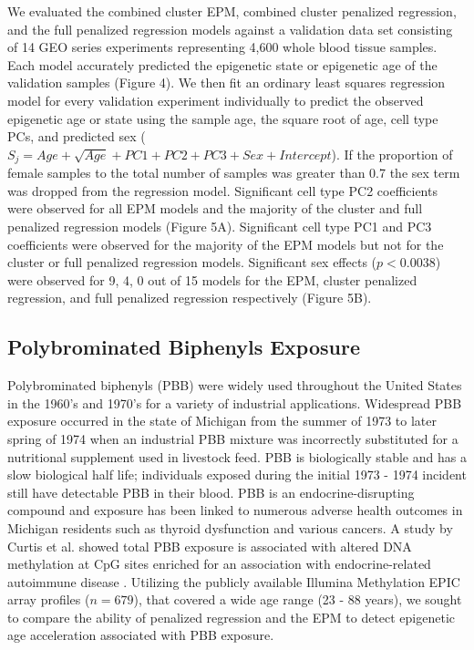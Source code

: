 \documentclass{article}
\begin{document}
{{\begin{linenumbers}
We evaluated the combined cluster EPM, combined cluster penalized regression, and the full penalized regression models 
against a validation data set consisting of 14 GEO series experiments representing 4,600 whole blood tissue samples. 
Each model accurately predicted the epigenetic state or epigenetic age of the validation samples (Figure 4). We then 
fit an ordinary least squares regression model for every validation experiment individually to predict the observed 
epigenetic age or state using the sample age, the square root of age, cell type PCs, and predicted sex 
($S_j  = Age + \sqrt{Age} + PC1 + PC2 + PC3 + Sex + Intercept$). If the proportion of female samples to the total 
number of samples was greater than 0.7 the sex term was dropped from the regression model. Significant cell type 
PC2 coefficients were observed for all EPM models and the majority of the cluster and full penalized regression 
models (Figure 5A). Significant cell type PC1 and PC3 coefficients were observed for the majority of the EPM models 
but not for the cluster or full penalized regression models. Significant sex effects ($p < 0.0038$) were 
observed for 9, 4, 0 out of 15 models for the EPM, cluster penalized regression, and full penalized regression 
respectively (Figure 5B). 

\subsection{Polybrominated Biphenyls Exposure}

Polybrominated biphenyls (PBB) were widely used throughout the United States in the 1960’s and 1970’s for a variety of 
industrial applications. Widespread PBB exposure occurred in the state of Michigan from the summer of 1973 to later 
spring of 1974 when an industrial PBB mixture was incorrectly substituted for a nutritional supplement used in livestock 
feed\cite{Fries1985-nf}. PBB is biologically stable and has a slow biological half life; individuals exposed during the 
initial 1973 - 1974 incident still have detectable PBB in their blood\cite{Safe1984-sz}. PBB is an endocrine-disrupting 
compound and exposure has been linked to numerous adverse health outcomes in Michigan residents such as thyroid 
dysfunction\cite{Jacobson2017-yi,Curtis2019-mv} and various cancers\cite{Terrell2016-yw,Hoque1998-so}. A study by 
Curtis et al. showed total PBB exposure is associated with altered DNA methylation at CpG sites enriched for an 
association with endocrine-related autoimmune disease \cite{Curtis2019-gz}. Utilizing the publicly available 
Illumina Methylation EPIC array \cite{Pidsley2016-bg}  profiles ($n=679$), that covered a wide age range 
(23 - 88 years), we sought to compare the ability of penalized regression and the EPM to detect epigenetic age 
acceleration associated with PBB exposure. 


\end{linenumbers}}}
\end{document}
